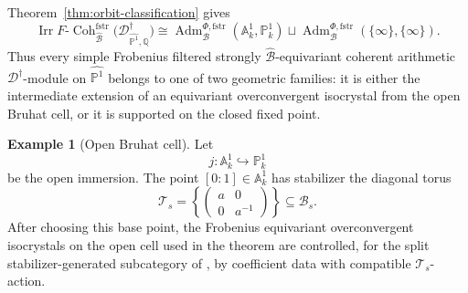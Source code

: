\documentclass[11pt]{amsart}
\theoremstyle{plain}
\theoremstyle{definition}
\newtheorem{example}{Example}[section]
\theoremstyle{remark}
\newcommand{\fstr}{\mathrm{fstr}}
\newcommand{\Adm}{\operatorname{Adm}}
\begin{document}
Theorem~\ref{thm:orbit-classification} gives
\[
  \operatorname{Irr}
  F\text{-}\operatorname{Coh}^{\fstr}_{\widehat{\mathcal B}}
  \bigl(\mathscr D^\dagger_{\widehat{\mathbb P^1},\mathbb Q}\bigr)
  \cong
  \Adm^{\Phi,\fstr}_{\mathcal B}(\mathbb A^1_k,\mathbb P^1_k)
  \sqcup
  \Adm^{\Phi,\fstr}_{\mathcal B}(\{\infty\},\{\infty\}).
\]
Thus every simple Frobenius filtered strongly \(\widehat{\mathcal B}\)-equivariant coherent
arithmetic \(\mathscr D^\dagger\)-module on \(\widehat{\mathbb P^1}\) belongs
to one of two geometric families: it is either the intermediate extension of
an equivariant overconvergent isocrystal from the open Bruhat cell, or it is
supported on the closed fixed point.

\begin{example}[Open Bruhat cell]
\label{ex:SL2-open-cell}
Let
\[
  j:\mathbb A^1_k\hookrightarrow \mathbb P^1_k
\]
be the open immersion. The point \([0:1]\in\mathbb A^1_k\) has stabilizer the
diagonal torus
\[
  \mathcal T_s=
  \left\{
  \begin{pmatrix}
  a & 0 \\
  0 & a^{-1}
  \end{pmatrix}
  \right\}
  \subseteq \mathcal B_s.
\]
After choosing this base point, the Frobenius equivariant
overconvergent isocrystals on the open cell used in the theorem are controlled,
for the split stabilizer-generated subcategory of , by
coefficient data with compatible \(\mathcal T_s\)-action.


\end{example}
\end{document}
